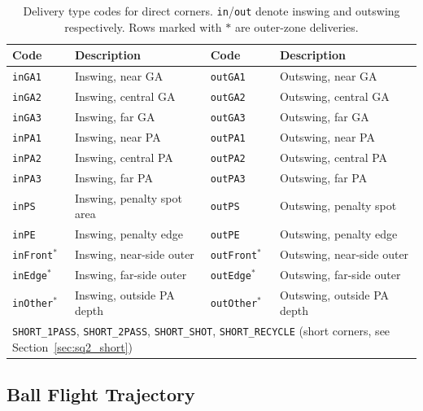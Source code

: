 \begin{table}[h]
  \centering
  \caption{Delivery type codes for direct corners. \texttt{in}/\texttt{out}
           denote inswing and outswing respectively. Rows marked with $*$ are
           outer-zone deliveries.}
  \label{tab:delivery_types}
  \begin{tabular}{ll|ll}
    \toprule
    \textbf{Code} & \textbf{Description} &
    \textbf{Code} & \textbf{Description} \\
    \midrule
    \texttt{inGA1} & Inswing, near GA  & \texttt{outGA1} & Outswing, near GA \\
    \texttt{inGA2} & Inswing, central GA & \texttt{outGA2} & Outswing, central GA \\
    \texttt{inGA3} & Inswing, far GA   & \texttt{outGA3} & Outswing, far GA \\
    \texttt{inPA1} & Inswing, near PA  & \texttt{outPA1} & Outswing, near PA \\
    \texttt{inPA2} & Inswing, central PA & \texttt{outPA2} & Outswing, central PA \\
    \texttt{inPA3} & Inswing, far PA   & \texttt{outPA3} & Outswing, far PA \\
    \texttt{inPS}  & Inswing, penalty spot area & \texttt{outPS} & Outswing, penalty spot \\
    \texttt{inPE}  & Inswing, penalty edge & \texttt{outPE} & Outswing, penalty edge \\
    \texttt{inFront}$^*$  & Inswing, near-side outer &
    \texttt{outFront}$^*$ & Outswing, near-side outer \\
    \texttt{inEdge}$^*$   & Inswing, far-side outer &
    \texttt{outEdge}$^*$  & Outswing, far-side outer \\
    \texttt{inOther}$^*$  & Inswing, outside PA depth &
    \texttt{outOther}$^*$ & Outswing, outside PA depth \\
    \midrule
    \multicolumn{4}{l}{\texttt{SHORT\_1PASS}, \texttt{SHORT\_2PASS},
                        \texttt{SHORT\_SHOT}, \texttt{SHORT\_RECYCLE}
                        (short corners, see Section~\ref{sec:sq2_short})} \\
    \bottomrule
  \end{tabular}
\end{table}

\subsection{Ball Flight Trajectory}
\label{sec:sq2_flight}

